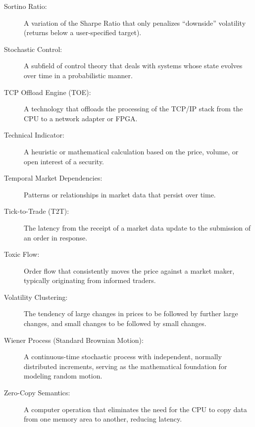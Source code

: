 \begin{description}
    \item[Sortino Ratio:] A variation of the Sharpe Ratio that only penalizes ``downside'' volatility (returns below a user-specified target).
    
    \item[Stochastic Control:] A subfield of control theory that deals with systems whose state evolves over time in a probabilistic manner.
    
    \item[TCP Offload Engine (TOE):] A technology that offloads the processing of the TCP/IP stack from the CPU to a network adapter or FPGA.
    
    \item[Technical Indicator:] A heuristic or mathematical calculation based on the price, volume, or open interest of a security.
    
    \item[Temporal Market Dependencies:] Patterns or relationships in market data that persist over time.
    
    \item[Tick-to-Trade (T2T):] The latency from the receipt of a market data update to the submission of an order in response.
    
    \item[Toxic Flow:] Order flow that consistently moves the price against a market maker, typically originating from informed traders.

    \item[Volatility Clustering:] The tendency of large changes in prices to be followed by further large changes, and small changes to be followed by small changes.

    \item[Wiener Process (Standard Brownian Motion):] A continuous-time stochastic process with independent, normally distributed increments, serving as the mathematical foundation for modeling random motion.
    
    \item[Zero-Copy Semantics:] A computer operation that eliminates the need for the CPU to copy data from one memory area to another, reducing latency.
\end{description}
